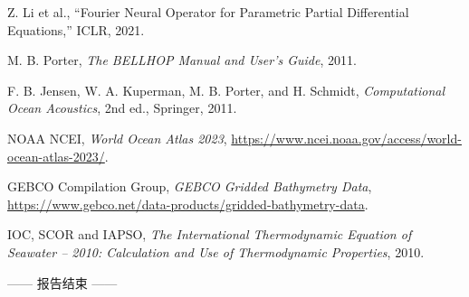 \documentclass[UTF8,11pt]{ctexart}
\begin{document}
\begin{enumerate}[label={[\arabic*]}]
  \item Z. Li et al., ``Fourier Neural Operator for Parametric Partial Differential Equations,''
  ICLR, 2021.
  \item M. B. Porter, \textit{The BELLHOP Manual and User's Guide}, 2011.
  \item F. B. Jensen, W. A. Kuperman, M. B. Porter, and H. Schmidt,
  \textit{Computational Ocean Acoustics}, 2nd ed., Springer, 2011.
  \item NOAA NCEI, \textit{World Ocean Atlas 2023},
  \url{https://www.ncei.noaa.gov/access/world-ocean-atlas-2023/}.
  \item GEBCO Compilation Group, \textit{GEBCO Gridded Bathymetry Data},
  \url{https://www.gebco.net/data-products/gridded-bathymetry-data}.
  \item IOC, SCOR and IAPSO, \textit{The International Thermodynamic Equation of Seawater
  -- 2010: Calculation and Use of Thermodynamic Properties}, 2010.
\end{enumerate}

\vfill
\begin{center}
\color{gray}\small —— 报告结束 ——
\end{center}
\end{document}
